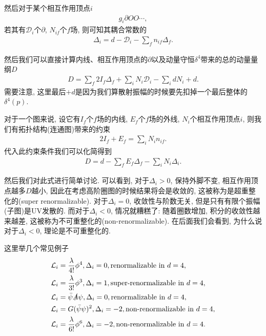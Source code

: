 然后对于某个相互作用顶点$i$
\begin{align}
    g_i\partial O O\cdots,
\end{align}
若其有$\mathcal D_i$个$\partial$, $N_{if}$个$f$场, 则可知其耦合常数的
\begin{align}
    \Delta_i=d-\mathcal D_i - \sum_f n_{if}\Delta_f.
\end{align}

然后我们可以直接计算内线、相互作用顶点的$\partial$以及动量守恒$\delta^4$带来的总的动量量纲$D$
\begin{align}
    D=\sum_f 2I_f\Delta_f+\sum_i N_i\mathcal D_i-\sum_i dN_i+d.
\end{align}
需要注意, 这里最后$+d$是因为我们算散射振幅的时候要先扣掉一个最后整体的$\delta^4(p)$.

对于一个图来说, 设它有$I_f$个$f$场的内线, $E_f$个$f$场的外线, $N_i$个相互作用顶点$i$, 则我们有拓扑结构(连通图)带来的约束
\begin{align}
    2I_f+E_f=\sum_i N_i n_{if}.
\end{align}
代入此约束条件我们可以化简得到
\begin{align}
    D=d-\sum_f E_f\Delta_f-\sum_i N_i\Delta_i.
\end{align}

然后我们对此式进行简单讨论. 可以看到, 对于$\Delta_i>0$, 保持外脚不变, 相互作用顶点越多$D$越小, 因此在考虑高阶圈图的时候结果将会是收敛的, 这被称为是超重整化的(super renormalizable). 对于$\Delta_i=0$, 收敛性与阶数无关, 但是只有有限个振幅(子图)是UV发散的. 而对于$\Delta_i<0$, 情况就糟糕了: 随着圈数增加, 积分的收敛性越来越差, 这被称为不可重整化的(non-renormalizable). 在后面我们会看到, 为什么说对于$\Delta_i<0$, 理论是不可重整化的.

这里举几个常见例子
\begin{align}
    & \mathcal L_i=\frac\lambda{4!}\phi^4, \Delta_i=0, \textrm{renormalizable in } d=4,\notag\\
    & \mathcal L_i=\frac\lambda{3!}\phi^3, \Delta_i=1, \textrm{super-renormalizable in } d=4,\notag\\
    & \mathcal L_i=\bar\psi\slashed A\psi, \Delta_i=0, \textrm{renormalizable in } d=4,\notag\\
    & \mathcal L_i=G(\bar\psi\psi)^2, \Delta_i=-2, \textrm{non-renormalizable in } d=4,\notag\\
    & \mathcal L_i=\frac\lambda{6!}\phi^6, \Delta_i=-2, \textrm{non-renormalizable in } d=4.\notag
\end{align}

